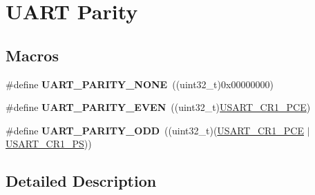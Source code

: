 \hypertarget{group___u_a_r_t___parity}{}\section{U\+A\+RT Parity}
\label{group___u_a_r_t___parity}
\subsection*{Macros}
\begin{DoxyCompactItemize}
\item 
\#define {\bfseries U\+A\+R\+T\+\_\+\+P\+A\+R\+I\+T\+Y\+\_\+\+N\+O\+NE}~((uint32\+\_\+t)0x00000000)\hypertarget{group___u_a_r_t___parity_ga270dea6e1a92dd83fe58802450bdd60c}{}\label{group___u_a_r_t___parity_ga270dea6e1a92dd83fe58802450bdd60c}

\item 
\#define {\bfseries U\+A\+R\+T\+\_\+\+P\+A\+R\+I\+T\+Y\+\_\+\+E\+V\+EN}~((uint32\+\_\+t)\hyperlink{group___peripheral___registers___bits___definition_ga60f8fcf084f9a8514efafb617c70b074}{U\+S\+A\+R\+T\+\_\+\+C\+R1\+\_\+\+P\+CE})\hypertarget{group___u_a_r_t___parity_ga063b14ac42ef9e8f4246c17a586b14eb}{}\label{group___u_a_r_t___parity_ga063b14ac42ef9e8f4246c17a586b14eb}

\item 
\#define {\bfseries U\+A\+R\+T\+\_\+\+P\+A\+R\+I\+T\+Y\+\_\+\+O\+DD}~((uint32\+\_\+t)(\hyperlink{group___peripheral___registers___bits___definition_ga60f8fcf084f9a8514efafb617c70b074}{U\+S\+A\+R\+T\+\_\+\+C\+R1\+\_\+\+P\+CE} $\vert$ \hyperlink{group___peripheral___registers___bits___definition_ga2e159d36ab2c93a2c1942df60e9eebbe}{U\+S\+A\+R\+T\+\_\+\+C\+R1\+\_\+\+PS}))\hypertarget{group___u_a_r_t___parity_ga229615e64964f68f7a856ea6ffea359e}{}\label{group___u_a_r_t___parity_ga229615e64964f68f7a856ea6ffea359e}

\end{DoxyCompactItemize}


\subsection{Detailed Description}

